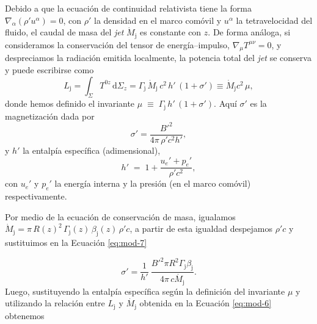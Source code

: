 	Debido a que la ecuación de continuidad relativista tiene la forma $\nabla_{\alpha}(\rho' u^\alpha)=0$, con $\rho'$ la densidad en el marco comóvil y $u^\alpha$ la tetravelocidad del fluido, el caudal de masa del \textit{jet} $\dot{M}_{\mathrm{j}}$ es constante con $z$.
	De forma análoga, si consideramos la conservación del tensor de energía–impulso, $\nabla_\mu T^{\mu\nu}=0$, y despreciamos la radiación emitida localmente, la potencia total del \textit{jet} se conserva y puede escribirse como
\begin{equation}\label{eq:mod-6}
    L_{\mathrm{j}}=\int_\Sigma T^{0z}\, \mathrm{d}\Sigma_z
    = \Gamma_{\mathrm{j}}\,\dot{M}_{\mathrm{j}}\,c^2\,h'\,(1+\sigma') \equiv \dot{M}_{\mathrm{j}} c^2\,\mu ,
\end{equation}
donde hemos definido el invariante $\mu \;\equiv\; \Gamma_{\mathrm{j}}\,h'\,(1+\sigma')$. Aqu\'i $\sigma'$ es la magnetización dada por
\begin{equation}\label{eq:mod-7}
    \sigma'=\frac{B'^2}{4\pi\,\rho' c^2 h'} ,
\end{equation}
y $h'$ la entalpía específica (adimensional),
\begin{equation}\label{eq:mod-8}
    h' \;=\; 1+\frac{u_e'+p_e'}{\rho' c^2} ,
\end{equation}
con $u_e'$ y $p_e'$ la energía interna y la presión (en el marco comóvil) respectivamente.

	Por medio de la ecuaci\'on de conservaci\'on de masa, igualamos $\dot{M}_{\mathrm{j}} = \pi\,R(z)^2\,\Gamma_{\mathrm{j}}(z)\,\beta_{\mathrm{j}}(z)\,\rho' c$, a partir de esta igualdad despejamos $\rho' c$ y sustituimos en la Ecuaci\'on \ref{eq:mod-7}
	
	\begin{equation}
	\sigma'=\frac{1}{h'}~ \frac{B'^2\pi R^2\Gamma_\mathrm{j}\beta_\mathrm{j}}{4\pi\,c\dot{M_\mathrm{j}}}.
	\end{equation}
	Luego, sustituyendo la entalp\'ia espec\'ifica seg\'un la definici\'on del invariante $\mu$ y utilizando la relaci\'on entre $L_\mathrm{j}$ y $\dot{M_\mathrm{j}}$ obtenida en la Ecuaci\'on \ref{eq:mod-6} obtenemos
	
